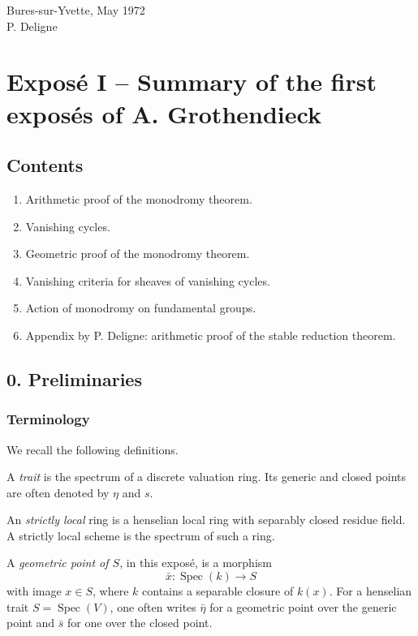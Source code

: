 \documentclass[12pt]{article}
\newcommand{\Spec}{\operatorname{Spec}}
\begin{document}
\begin{flushright}
Bures-sur-Yvette, May 1972\\
P. Deligne
\end{flushright}

\section*{Exposé I -- Summary of the first exposés of A. Grothendieck}

\subsection*{Contents}
\begin{enumerate}[label=\arabic*.]
\item Arithmetic proof of the monodromy theorem.
\item Vanishing cycles.
\item Geometric proof of the monodromy theorem.
\item Vanishing criteria for sheaves of vanishing cycles.
\item Action of monodromy on fundamental groups.
\item Appendix by P. Deligne: arithmetic proof of the stable reduction theorem.
\end{enumerate}

\subsection*{0. Preliminaries}

\subsubsection*{Terminology}

We recall the following definitions.

A \emph{trait} is the spectrum of a discrete valuation ring. Its generic and closed points are often denoted by $\eta$ and $s$.

An \emph{strictly local} ring is a henselian local ring with separably closed residue field. A strictly local scheme is the spectrum of such a ring.

A \emph{geometric point of $S$}, in this exposé, is a morphism
\[
\bar x:\Spec(k)\to S
\]
with image $x\in S$, where $k$ contains a separable closure of $k(x)$. For a henselian trait $S=\Spec(V)$, one often writes $\bar\eta$ for a geometric point over the generic point and $\bar s$ for one over the closed point.
\end{document}

